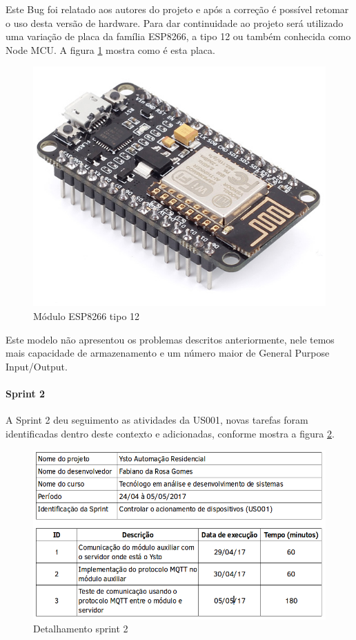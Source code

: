 Este Bug foi relatado aos autores do projeto e após a correção é possível retomar o uso desta versão de hardware. Para dar continuidade ao projeto será utilizado uma variação de placa da família ESP8266, a tipo 12 ou também conhecida como Node MCU. A figura \ref{ma-novo-preeview} mostra como é esta placa.

\begin{figure}[H]
\caption{\label{ma-novo-preeview} Módulo ESP8266 tipo 12}
\includegraphics[scale=0.25]{img/esp8266-12.png}
\end{figure}

Este modelo não apresentou os problemas descritos anteriormente, nele temos mais capacidade de armazenamento e um número maior de General Purpose Input/Output.


\paragraph{Sprint 2} A Sprint 2 deu seguimento as atividades da US001, novas tarefas foram identificadas dentro deste contexto e adicionadas, conforme mostra a figura \ref{sprint-2}.

\begin{figure}[H]
\caption{\label{sprint-2} Detalhamento sprint 2}
\includegraphics[scale=0.5]{img/sprint-2.png}
\end{figure}

